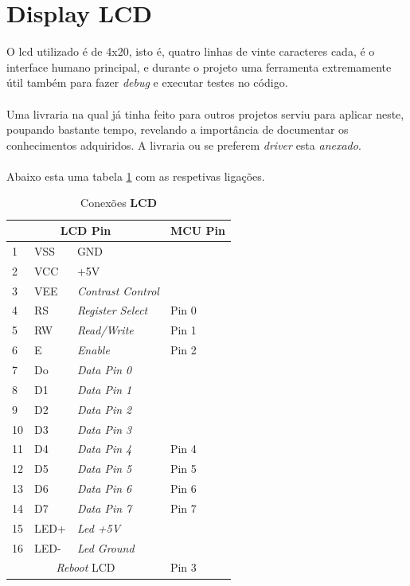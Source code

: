 \section{Display LCD}
O \ac{lcd} utilizado é de 4x20, isto é, quatro linhas de vinte caracteres cada, é o interface humano principal, e durante o projeto uma ferramenta extremamente útil também para fazer \textit{debug} e executar testes no código.
\\
\\
Uma livraria na qual já tinha feito para outros projetos serviu para aplicar neste, poupando bastante tempo, revelando a importância de documentar os conhecimentos adquiridos. A livraria ou se preferem \textit{driver} esta \textit{anexado}.
\\
\\
Abaixo esta uma tabela \ref{LCD_connections} com as respetivas ligações.
\begin{table}[H]
	\centering
	\caption{Conexões \textbf{LCD}}
	\begin{tabular}{||p{1cm} p{2cm} p{4cm} | p{1cm}||} 
		\hline
		\multicolumn{3}{||c|}{\textbf{LCD Pin}} & \multicolumn{1}{|c||}{\textbf{MCU Pin}}\\ [1ex]
		\hline
		1 & VSS & GND & \\
		2 & VCC & +5V & \\
		3 & VEE & \textit{Contrast Control} & \\
		4 & RS & \textit{Register Select} & Pin 0 \\
		5 & RW & \textit{Read/Write} & Pin 1 \\
		6 & E & \textit{Enable} & Pin 2 \\
		7 & Do & \textit{Data Pin 0} & \\
		8 & D1 & \textit{Data Pin 1} & \\
		9 & D2 & \textit{Data Pin 2} & \\
		10 & D3 & \textit{Data Pin 3} & \\
		11 & D4 & \textit{Data Pin 4} & Pin 4 \\
		12 & D5 & \textit{Data Pin 5} & Pin 5 \\
		13 & D6 & \textit{Data Pin 6} & Pin 6 \\
		14 & D7 & \textit{Data Pin 7} & Pin 7 \\
		15 & LED+ & \textit{Led +5V} &  \\
		16 & LED- & \textit{Led Ground} & \\
		\multicolumn{3}{||c|}{\textit{Reboot} LCD} & \multicolumn{1}{|l||}{Pin 3}\\ [1ex]
		\hline
	\end{tabular}	
	\label{LCD_connections}
\end{table}
